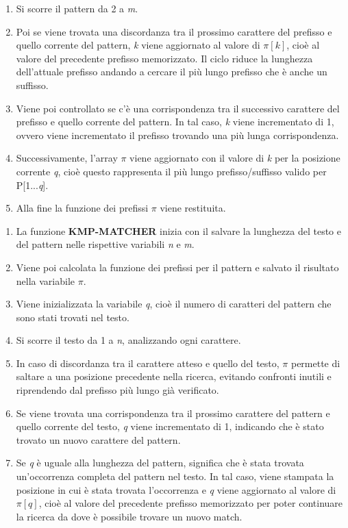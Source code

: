 \documentclass{article}
\begin{document}
\begin{itemize}
\begin{enumerate}[label=\arabic*a.]
              \item Si scorre il pattern da 2 a \textit{m}.
              \item Poi se viene trovata una discordanza tra il prossimo carattere del prefisso e quello corrente del pattern, \textit{k} viene aggiornato al valore di $\pi[k]$, cioè al valore del precedente prefisso memorizzato. Il ciclo riduce la lunghezza dell'attuale prefisso andando a cercare il più lungo prefisso che è anche un suffisso.
              \item Viene poi controllato se c'è una corrispondenza tra il successivo carattere del prefisso e quello corrente del pattern. In tal caso, \textit{k} viene incrementato di 1, ovvero viene incrementato il prefisso trovando una più lunga corrispondenza.
              \item Successivamente, l'array $\pi$ viene aggiornato con il valore di \textit{k} per la posizione corrente \textit{q}, cioè questo rappresenta il più lungo prefisso/suffisso valido per P[1...\textit{q}].
              \item Alla fine la funzione dei prefissi $\pi$ viene restituita.
          \end{enumerate}
          \begin{enumerate}[label=\arabic*b.]
              \item La funzione \textbf{KMP-MATCHER} inizia con il salvare la lunghezza del testo e del pattern nelle rispettive variabili \textit{n} e \textit{m}.
              \item Viene poi calcolata la funzione dei prefissi per il pattern e salvato il risultato nella variabile $\pi$.
              \item Viene inizializzata la variabile \textit{q}, cioè il numero di caratteri del pattern che sono stati trovati nel testo.
              \item Si scorre il testo da 1 a \textit{n}, analizzando ogni carattere.
              \item In caso di discordanza tra il carattere atteso e quello del testo, $\pi$ permette di saltare a una posizione precedente nella ricerca, evitando confronti inutili e riprendendo dal prefisso più lungo già verificato.
              \item Se viene trovata una corrispondenza tra il prossimo carattere del pattern e quello corrente del testo, \textit{q} viene incrementato di 1, indicando che è stato trovato un nuovo carattere del pattern.
              \item Se \textit{q} è uguale alla lunghezza del pattern, significa che è stata trovata un'occorrenza completa del pattern nel testo. In tal caso, viene stampata la posizione in cui è stata trovata l'occorrenza e \textit{q} viene aggiornato al valore di $\pi[q]$, cioè al valore del precedente prefisso memorizzato per poter continuare la ricerca da dove è possibile trovare un nuovo match.

\end{enumerate}
\end{itemize}
\end{document}
